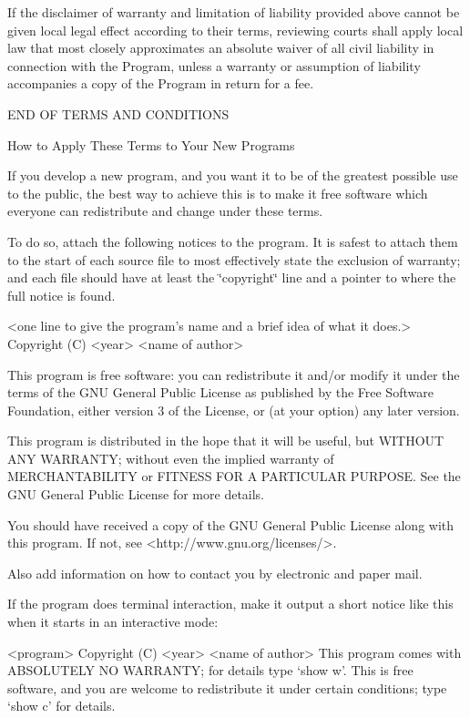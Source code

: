 If the disclaimer of warranty and limitation of liability provided above cannot be given local legal effect according to their terms, reviewing courts shall apply local law that most closely approximates an absolute waiver of all civil liability in connection with the Program, unless a warranty or assumption of liability accompanies a copy of the Program in return for a fee. \begin{DoxyVerb}                 END OF TERMS AND CONDITIONS

        How to Apply These Terms to Your New Programs
\end{DoxyVerb}


If you develop a new program, and you want it to be of the greatest possible use to the public, the best way to achieve this is to make it free software which everyone can redistribute and change under these terms.

To do so, attach the following notices to the program. It is safest to attach them to the start of each source file to most effectively state the exclusion of warranty; and each file should have at least the \char`\"{}copyright\char`\"{} line and a pointer to where the full notice is found. \begin{DoxyVerb}<one line to give the program's name and a brief idea of what it does.>
Copyright (C) <year>  <name of author>

This program is free software: you can redistribute it and/or modify
it under the terms of the GNU General Public License as published by
the Free Software Foundation, either version 3 of the License, or
(at your option) any later version.

This program is distributed in the hope that it will be useful,
but WITHOUT ANY WARRANTY; without even the implied warranty of
MERCHANTABILITY or FITNESS FOR A PARTICULAR PURPOSE.  See the
GNU General Public License for more details.

You should have received a copy of the GNU General Public License
along with this program.  If not, see <http://www.gnu.org/licenses/>.
\end{DoxyVerb}


Also add information on how to contact you by electronic and paper mail.

If the program does terminal interaction, make it output a short notice like this when it starts in an interactive mode\+: \begin{DoxyVerb}<program>  Copyright (C) <year>  <name of author>
This program comes with ABSOLUTELY NO WARRANTY; for details type `show w'.
This is free software, and you are welcome to redistribute it
under certain conditions; type `show c' for details.
\end{DoxyVerb}


